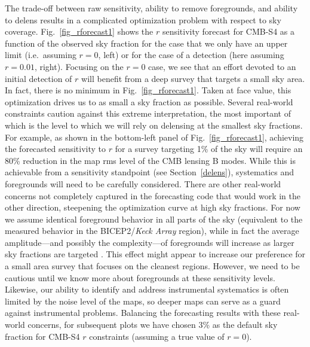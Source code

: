 The trade-off between raw sensitivity, ability to remove foregrounds, and ability to delens results in a complicated optimization problem with respect to sky coverage.
Fig.~\ref{fig_rforecast1} shows the $r$ sensitivity forecast for CMB-S4 as a function of the observed sky fraction for the case that we only have an upper limit (i.e.\ assuming $r=0$, left) or for the case of a detection (here assuming $r=0.01$, right).
Focusing on the $r=0$ case, we see that an effort devoted to an initial detection of $r$ will benefit from a deep survey that targets a small sky area.
In fact, there is no minimum in Fig.~\ref{fig_rforecast1}. Taken at face value, this optimization drives us to as small a sky fraction as possible. 
Several real-world constraints caution against this extreme interpretation, the most important of which is the level to which we will rely on delensing at the smallest sky fractions.
For example, as shown in the bottom-left panel of Fig.~\ref{fig_rforecast1}, achieving the forecasted sensitivity to $r$ for a survey targeting 1\% of the sky will require an 80\% reduction in the map rms level of the CMB lensing B modes. 
While this is achievable from a sensitivity standpoint (see Section~\ref{delens}), systematics and foregrounds will need to be carefully considered.
There are other real-world concerns not completely captured in the forecasting code that would work in the other direction, steepening the optimization curve at high sky fractions.
For now we assume identical foreground behavior in all parts of the sky (equivalent to the measured behavior in the { BICEP}2/{\em Keck Array} region), while in fact the average amplitude---and possibly the complexity---of foregrounds will increase as larger sky fractions are targeted \cite{Adam:2014bub,Aghanim:2016cps}.
This effect might appear to increase our preference for a small area survey that focuses on the cleanest regions. However, we need to be cautious until we know more about foregrounds at these sensitivity levels.
Likewise, our ability to identify and address instrumental systematics is often limited by the noise level of the maps, so deeper maps can serve as a guard against instrumental problems.
Balancing the forecasting results with these real-world concerns, for subsequent plots we have chosen 3\% as the default sky fraction for CMB-S4 $r$ constraints (assuming a true value of $r=0$).

